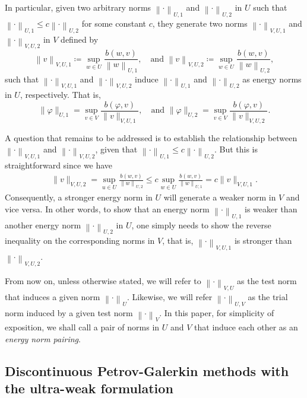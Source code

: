 \documentclass[11pt,onecolumn]{scrartcl}
\newcommand{\seclab}[1]{\label{sec:#1}}
\newcommand{\nor}[1]{\left\| #1 \right\|}
\newcommand{\LRp}[1]{\left( #1 \right)}
\begin{document}
In particular, given two arbitrary norms $\nor{\cdot}_{U,1}$ and $\nor{\cdot}_{U,2}$ in $U$
such that $\nor{\cdot}_{U,1} \le c \nor{\cdot}_{U,2}$ for some constant
$c$, they generate two norms $\nor{\cdot}_{V,U,1}$ and
$\nor{\cdot}_{V,U,2}$ in $V$ defined by
\[
\nor{v}_{V,U,1} \coloneqq \sup_{w \in U}\frac{b\LRp{w,v}}{\nor{w}_{U,1}}, \quad
\text{and }\nor{v}_{V,U,2} \coloneqq \sup_{w \in U}\frac{b\LRp{w,v}}{\nor{w}_{U,2}},
\]
such that $\nor{\cdot}_{V,U,1}$ and $\nor{\cdot}_{V,U,2}$ induce
$\nor{\cdot}_{U,1}$ and $\nor{\cdot}_{U,2}$ as energy
norms in $U$, respectively. That is,
\[
\|\varphi\|_{U,1} = \sup_{v\in V}
\frac{b(\varphi,v)}{\|v\|_{V,U,1}}, \quad \text{and }\|\varphi\|_{U,2} = \sup_{v\in V}
\frac{b(\varphi,v)}{\|v\|_{V,U,2}}.
\]

A question that remains to be addressed is to establish the relationship
between $\nor{\cdot}_{V,U,1}$ and $\nor{\cdot}_{V,U,2}$, given that
$\nor{\cdot}_{U,1} \le c \nor{\cdot}_{U,2}$. But this is
straightforward since we have
\begin{align*}
 \| v \|_{V,U,2} = \sup_{u \in U} \frac{b\left(w,v\right)}{\left\|
  w \right\|_{U,2}} \le c\sup_{w \in U} \frac{b\left(w,v\right)}{\left\| w
  \right\|_{U,1}} = c\| v \|_{V,U,1}.
\end{align*}
Consequently, a stronger energy norm in $U$ will generate a weaker
norm in $V$ and vice versa. In other words, to show that an
energy norm $\nor{\cdot}_{U,1}$ is weaker than another energy norm
$\nor{\cdot}_{U,2}$ in $U$, one simply needs to show the reverse inequality on the
corresponding norms in $V$, that is, $\nor{\cdot}_{V,U,1}$ is stronger
than $\nor{\cdot}_{V,U,2}$.

From now on, unless otherwise stated, we will refer to $\nor{\cdot}_{V,U}$ as the test norm that induces a given norm $\nor{\cdot}_U$. Likewise, we will refer $\nor{\cdot}_{U,V}$ as the trial norm induced by a given test norm $\nor{\cdot}_V$. In this paper, for simplicity of exposition, we shall call a pair of norms in $U$ and $V$ that induce each other as an {\em energy norm pairing}.


\subsection{Discontinuous Petrov-Galerkin methods with the ultra-weak formulation}
\seclab{abstractUweak}
\end{document}
